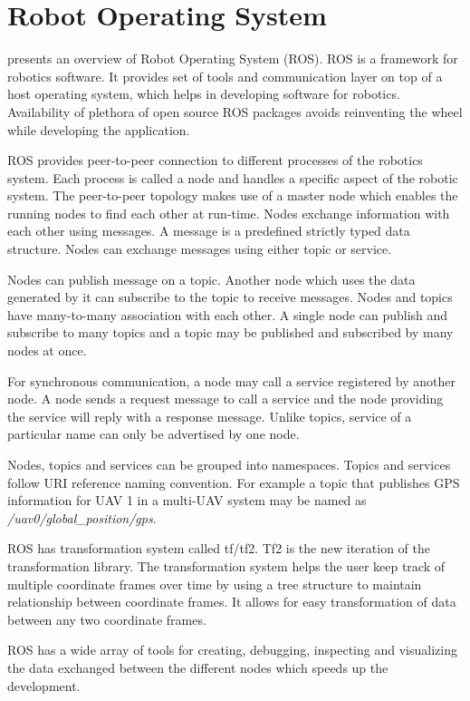\section{Robot Operating System}
 presents an overview of Robot Operating System (ROS). ROS is a framework for robotics software. It provides set of tools and communication layer on top of a host operating system, which helps in developing software for robotics. Availability of plethora of open source ROS packages avoids reinventing the wheel while developing the application.

ROS provides peer-to-peer connection to different processes of the robotics system. Each process is called a node and handles a specific aspect of the robotic system. The peer-to-peer topology makes use of a master node which enables the running nodes to find each other at run-time. Nodes exchange information with each other using messages. A message is a predefined strictly typed data structure. Nodes can exchange messages using either topic or service.

Nodes can publish message on a topic. Another node which uses the data generated by it can subscribe to the topic to receive messages. Nodes and topics have many-to-many association with each other. A single node can publish and subscribe to many topics and a topic may be published and subscribed by many nodes at once.

For synchronous communication, a node may call a service registered by another node. A node sends a request message to call a service and the node providing the service will reply with a response message. Unlike topics, service of a particular name can only be advertised by one node.

Nodes, topics and services can be grouped into namespaces. Topics and services follow URI reference naming convention. For example a topic that publishes GPS information for UAV 1 in a multi-UAV system may be named as \textit{/uav0/global\_position/gps}.

ROS has transformation system called tf/tf2. Tf2 is the new iteration of the transformation library. The transformation system helps the user keep track of multiple coordinate frames over time by using a tree structure to maintain relationship between coordinate frames. It allows for easy transformation of data between any two coordinate frames.

ROS has a wide array of tools for creating, debugging, inspecting and visualizing the data exchanged between the different nodes which speeds up the development.


